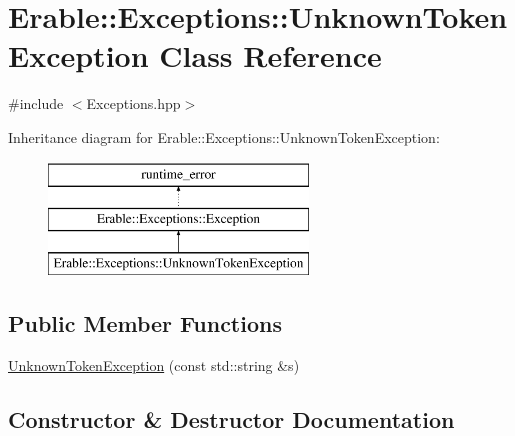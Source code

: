 \hypertarget{class_erable_1_1_exceptions_1_1_unknown_token_exception}{}\section{Erable\+::Exceptions\+::Unknown\+Token\+Exception Class Reference}
\label{class_erable_1_1_exceptions_1_1_unknown_token_exception}


{\ttfamily \#include $<$Exceptions.\+hpp$>$}

Inheritance diagram for Erable\+::Exceptions\+::Unknown\+Token\+Exception\+:\begin{figure}[H]
\begin{center}
\leavevmode
\includegraphics[height=3.000000cm]{class_erable_1_1_exceptions_1_1_unknown_token_exception}
\end{center}
\end{figure}
\subsection*{Public Member Functions}
\begin{DoxyCompactItemize}
\item 
\mbox{\hyperlink{class_erable_1_1_exceptions_1_1_unknown_token_exception_ac121ec72d9caeab82919d7ba7597e7d3}{Unknown\+Token\+Exception}} (const std\+::string \&s)
\end{DoxyCompactItemize}


\subsection{Constructor \& Destructor Documentation}
\mbox{\label{class_erable_1_1_exceptions_1_1_unknown_token_exception_ac121ec72d9caeab82919d7ba7597e7d3}} 
